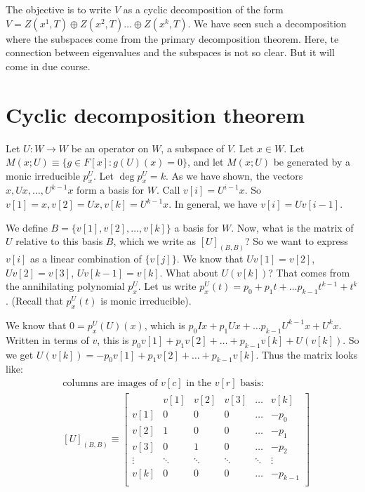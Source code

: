 \documentclass{book}
\newcommand{\osum}{\oplus} %
\theoremstyle{definition}
\begin{document}
The objective is to write $V$ as a cyclic decomposition of the form
$V = Z(x^1, T)\osum Z(x^2, T) \dots \osum Z(x^k, T)$. We have seen
such a decomposition where the subspaces come from the primary decomposition
theorem. Here, te connection between eigenvalues and the subspaces is
not so clear. But it will come in due course.

\section{Cyclic decomposition theorem}
Let $U: W \rightarrow W$ be an operator on $W$,
a subspace of $V$. Let $x \in W$. Let $M(x; U) \equiv \{ g \in F[x] : g(U)(x) = 0 \}$,
and let $M(x; U)$ be generated by a monic irreducible $p^U_x$.
Let $\deg p^U_x = k$. As we have shown, the vectors $x, Ux, \dots, U^{k-1} x$
form a basis for $W$. Call $v[i] = U^{i-1} x$.
So $v[1] = x, v[2] = Ux, v[k] = U^{k-1}x$. In general, we have $v[i] = Uv[i-1]$.

We define $B = \{ v[1], v[2], \dots, v[k] \}$ a basis for $W$. Now, what
is the matrix of $U$ relative to this basis $B$, which we write as $[U]_{(B, B)}$?
So we want to express $v[i]$ as a linear combination of $\{ v[j] \}$. We know
that $U v[1] = v[2]$, $U v[2] = v[3]$, $U v[k-1] = v[k]$. What about
$U (v[k])$? That comes from the annihilating polynomial $p^U_x$. 
Let us write $p^U_x(t) = p_0 + p_1t + \dots p_{k-1} t^{k-1} + t^k$.
(Recall that $p^U_x(t)$ is monic irreducible).

We know that $0 = p^U_x(U)(x)$, which is $p_0 Ix + p_1 U x + \dots p_{k-1} U^{k-1} x + U^k x$.
Written in terms of $v$, this is $p_0 v[1] + p_1 v[2] + \dots + p_{k-1} v[k] + U(v[k])$.
So we get $U(v[k]) = -p_0 v[1] + p_1 v[2] + \dots + p_{k-1} v[k]$.
Thus the matrix looks like:
\begin{align*}
&\text{columns are images of $v[c]$ in the $v[r]$ basis:} \\
&[U]_{(B, B)} \equiv
\begin{bmatrix}
       &   v[1] & v[2] & v[3]   &  \dots & v[k] \\
v[1]   &   0    &  0   &  0     &  \dots & -p_0 \\
v[2]   &   1    &  0   &  0     &  \dots & -p_1 \\
v[3]   &   0    &  1   &  0     &  \dots & -p_2 \\
\vdots & \ddots &\ddots&  \ddots&  \ddots& \vdots \\
v[k]   &   0    &  0   &  0     &  \dots & -p_{k-1}  \\
\end{bmatrix}
\end{align*}
\end{document}
